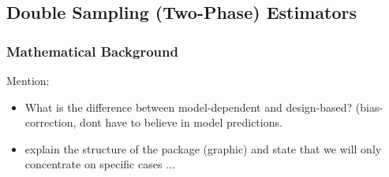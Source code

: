 \documentclass[article]{jss}
\begin{document}
\subsection{Double Sampling (Two-Phase) Estimators}

% 
% 
% 
% 
% 
% 

\subsubsection{Mathematical Background}

Mention:
\begin{itemize}
  \item What is the difference between model-dependent and design-based? (bias-correction, dont have to believe in model predictions.
  \item explain the structure of the package (graphic) and state that we will only concentrate on specific cases ...
\end{itemize}
\end{document}
